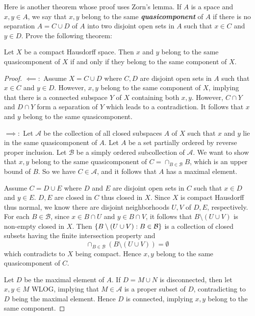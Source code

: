 \documentclass[12pt,a4paper]{article}
\begin{document}
    \begin{ex}
        Here is another theorem whose proof uses Zorn's lemma. If $A$ is a space and $x,y\in A$, we say that $x,y$ belong to the same \textbf{\textit{quasicomponent}} of $A$ if there is no separation $A=C\cup D$ of $A$ into two disjoint open sets in $A$ such that $x\in C$ and $y\in D$. Prove the following theorem:
        
        Let $X$ be a compact Hausdorff space. Then $x$ and $y$ belong to the same quasicomponent of $X$ if and only if they belong to the same component of $X$.
    \end{ex}
    \begin{proof}
        $\impliedby:$ Assume $X=C\cup D$ where $C,D$ are disjoint open sets in $A$ such that $x\in C$ and $y\in D$. However, $x,y$ belong to the same component of $X$, implying that there is a connected subspace $Y$ of $X$ containing both $x,y$. However, $C\cap Y$ and $D\cap Y$ form a separation of $Y$ which leads to a contradiction. It follows that $x$ and $y$ belong to the same quasicomponent. 

        $\implies:$ Let $\mathcal{A}$ be the collection of all closed subspaces $A$ of $X$ such that $x$ and $y$ lie in the same quasicomponent of $A$. 
        Let $A$ be a set partially ordered by reverse proper inclusion. Let $\mathcal{B}$ be a simply ordered subcollection of $\mathcal{A}$. We want to show that $x,y$ belong to the same quasicomponent of  $C=\cap_{B\in\mathcal{B}}B$, which is an upper bound of $B$. So we have $C\in\mathcal{A}$, and it follows that $A$ has a maximal element.

        Assume $C=D\cup E$ where $D$ and $E$ are disjoint open sets in $C$ such that $x\in D$ and $y\in E$. $D,E$ are closed in $C$ thus closed in $X$. Since $X$ is compact Hausdorff thus normal, we know there are disjoint neighborhoods $U,V$ of $D,E$, respectively. For each $B\in\mathcal{B}$, since $x\in B\cap U$ and $y\in B\cap V$, it follows that $B\setminus(U\cup V)$ is non-empty closed in $X$. Then $\left\{B\setminus(U\cup V):B\in\mathcal{B}\right\}$ is a collection of closed subsets having the finite intersection property and
        $$
        \cap_{B\in\mathcal{B}}(B\setminus(U\cup V))=\emptyset
        $$
        which contradicts to $X$ being compact. Hence $x,y$ belong to the same quasicomponent of $C$.

        Let $D$ be the maximal element of $A$. If $D=M\cup N$ is disconnected, then let $x,y\in M$ WLOG, implying that $M\in \mathcal{A}$ is a proper subset of $D$, contradicting to $D$ being the maximal element. Hence $D$ is connected, implying $x,y$ belong to the same component.        
    \end{proof}
    \hfill
\end{document}
